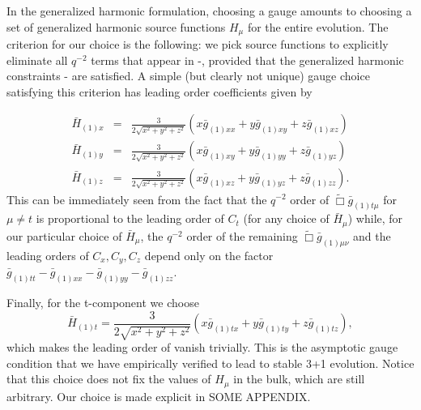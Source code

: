 \documentclass[12pt]{iopart} %
\begin{document}
In the generalized harmonic formulation, choosing a gauge amounts to choosing a set of generalized harmonic source functions $H_\mu$ for the entire evolution.
The criterion for our choice is the following: we pick source functions to explicitly eliminate all $q^{-2}$ terms that appear in -, provided that the generalized harmonic constraints - are satisfied.
A simple (but clearly not unique) gauge choice satisfying this criterion has leading order coefficients given by

\begin{eqnarray}\label{eqn:target_gauge_xyz}
\bar{H}_{(1)x}&=&\frac{3}{2\sqrt{x^2+y^2+z^2}}(x \bar{g}_{(1)xx}+y\bar{g}_{(1)xy}+z\bar{g}_{(1)xz}) \nonumber \\
\bar{H}_{(1)y}&=&\frac{3}{2\sqrt{x^2+y^2+z^2}}(x \bar{g}_{(1)xy}+y\bar{g}_{(1)yy}+z\bar{g}_{(1)yz}) \nonumber \\
\bar{H}_{(1)z}&=&\frac{3}{2\sqrt{x^2+y^2+z^2}}(x \bar{g}_{(1)xz}+y\bar{g}_{(1)yz}+z\bar{g}_{(1)zz}).
\end{eqnarray}
This can be immediately seen from the fact that the $q^{-2}$ order of $\tilde{\Box}\bar{g}_{(1)t\mu}$ for $\mu\neq t$ is proportional to the leading order of $C_t$ (for any choice of $\bar{H}_\mu$) while, for our particular choice of $\bar{H}_\mu$, the $q^{-2}$ order of the remaining $\tilde{\Box}\bar{g}_{(1)\mu\nu}$ and the leading orders of $C_x,C_y,C_z$ depend only on the factor $\bar{g}_{(1)tt}-\bar{g}_{(1)xx}-\bar{g}_{(1)yy}-\bar{g}_{(1)zz}$.

Finally, for the t-component we choose
\begin{equation}\label{eqn:target_gauge_t}
\bar{H}_{(1)t}=\frac{3}{2\sqrt{x^2+y^2+z^2}}(x \bar{g}_{(1)tx}+y\bar{g}_{(1)ty}+z\bar{g}_{(1)tz}),
\end{equation}
which makes the leading order of  vanish trivially.
This is the asymptotic gauge condition that we have empirically verified to lead to stable 3+1 evolution. Notice that this choice does not fix the values of $H_\mu$ in the bulk, which are still arbitrary. Our choice is made explicit in SOME APPENDIX.
\end{document}
